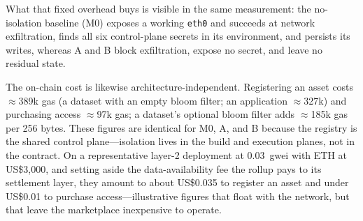 What that fixed overhead buys is visible in the same measurement: the no-isolation baseline
(M0) exposes a working \texttt{eth0} and succeeds at network exfiltration, finds all six
control-plane secrets in its environment, and persists its writes, whereas A and B block
exfiltration, expose no secret, and leave no residual state.

The on-chain cost is likewise architecture-independent. Registering an asset costs
$\approx$389k gas (a dataset with an empty bloom filter; an application $\approx$327k) and
purchasing access $\approx$97k gas; a dataset's optional bloom filter adds $\approx$185k gas
per 256 bytes. These figures are identical for M0, A, and B because the registry is the
shared control plane---isolation lives in the build and execution planes, not in the
contract. On a representative layer-2 deployment at 0.03~gwei with ETH at US\$3,000, and
setting aside the data-availability fee the rollup pays to its settlement layer, they amount
to about US\$0.035 to register an asset and under US\$0.01 to purchase access---illustrative
figures that float with the network, but that leave the marketplace inexpensive to operate.

